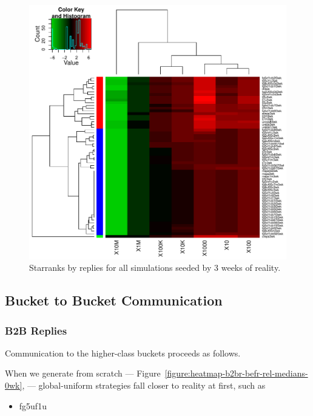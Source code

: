 \documentclass[10pt,oneside]{memoir}
\begin{document}
\begin{Spacing}{2}
\begin{figure}
\begin{center}
    \includegraphics{figures/crop/heatmap-sbucks-reps-star-med-medians-3wk}
    \caption{Starranks by replies for all simulations seeded by 3 weeks of reality.}
    \label{figure:heatmap-sbucks-reps-star-med-medians-3wk}
\end{center}
\end{figure}
\pagebreak \subsection{Bucket to Bucket Communication}
\label{buckettobucketcommunication}

\subsubsection{B2B Replies}
\label{b2breplies}

Communication to the higher-class buckets proceeds as follows.


When we generate from scratch --- Figure~\ref{figure:heatmap-b2br-befr-rel-medians-0wk}, --- global-uniform strategies fall closer to reality at first, such as


\begin{itemize}


\item fg5uf1u


\end{itemize}
\end{Spacing}
\end{document}
